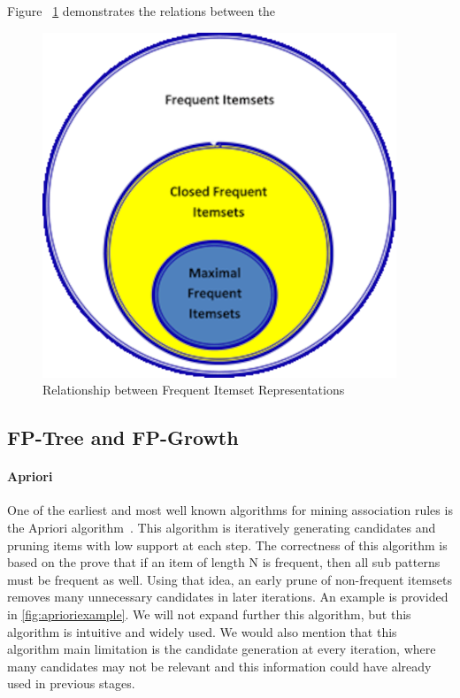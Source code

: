 Figure ~\ref{fig:relationBetweenFIS} demonstrates the relations between the 
\begin{figure}
  \centering
  \includegraphics[width=\linewidth]{figures/relationBetweenFIS}
  \caption{Relationship between Frequent Itemset Representations}
  \label{fig:relationBetweenFIS}
\end{figure}

\subsection{FP-Tree and FP-Growth}
\paragraph{Apriori}
One of the earliest and most well known algorithms for mining association rules is the Apriori algorithm~\cite{agrawal1994fast}. This algorithm is iteratively generating candidates and pruning items with low support at each step. The correctness of this algorithm is based on the prove that if an item of length N is frequent, then all sub patterns must be frequent as well. Using that idea, an early prune of non-frequent itemsets removes many unnecessary candidates in later iterations. An example is provided in \autoref{fig:aprioriexample}. We will not expand further this algorithm, but this algorithm is intuitive and widely used. We would also mention that this algorithm main limitation is the candidate generation at every iteration, where many candidates may not be relevant and this information could have already used in previous stages.
  

